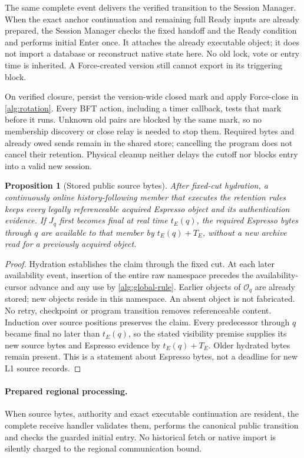\documentclass[11pt,a4paper]{article}
\newtheorem{proposition}[proposition]{Proposition}
\begin{document}
The same complete event delivers the verified transition to the Session
Manager. When the exact anchor continuation and remaining full Ready
inputs are already prepared, the Session Manager checks the fixed handoff and
the Ready condition and performs initial Enter once. It
attaches the already executable object; it does not import a database
or reconstruct native state here. No old lock, vote or entry time is
inherited. A Force-created version still cannot export in its triggering
block.

On verified closure, persist the version-wide closed mark and apply
Force-close in \cref{alg:rotation}. Every BFT action, including a timer
callback, tests that mark before it runs. Unknown old pairs are blocked
by the same mark, so no membership discovery or close relay is needed
to stop them. Required bytes and already owed sends remain in the shared
store; cancelling the program does not cancel their retention. Physical
cleanup neither delays the cutoff nor blocks entry into a valid new
session.

\begin{proposition}[Stored public source bytes]
\label{prop:retained-public-bytes}
After fixed-cut hydration, a continuously online history-following
member that executes the retention rules keeps every legally
referenceable acquired Espresso object and its authentication evidence.
If $J_q$ first becomes final at real time $t_E(q)$, the required
Espresso bytes through $q$ are available to that member by $t_E(q)+T_E$, without a
new archive read for a previously acquired object.
\end{proposition}
\begin{proof}
Hydration establishes the claim through the fixed cut. At each later
availability event, insertion of the entire raw namespace precedes the
availability-cursor advance and any use by \cref{alg:global-rule}.
Earlier objects of $\mathcal O_q$ are already stored; new objects reside
in this namespace. An absent
object is not fabricated. No retry, checkpoint or program transition
removes referenceable content. Induction over source positions preserves
the claim. Every predecessor through $q$ became final no later than $t_E(q)$,
so the stated visibility premise supplies its new source bytes and
Espresso evidence by $t_E(q)+T_E$. Older hydrated bytes remain present.
This is a statement about Espresso bytes, not a deadline for new L1 source records.
\end{proof}

\paragraph{Prepared regional processing.}
\label{sec:source-step-timing}
When source bytes, authority and exact executable continuation are
resident, the complete receive handler validates them, performs the
canonical public transition and checks the guarded initial entry.
No historical fetch or native import is silently charged to the
regional communication bound.
\end{document}

